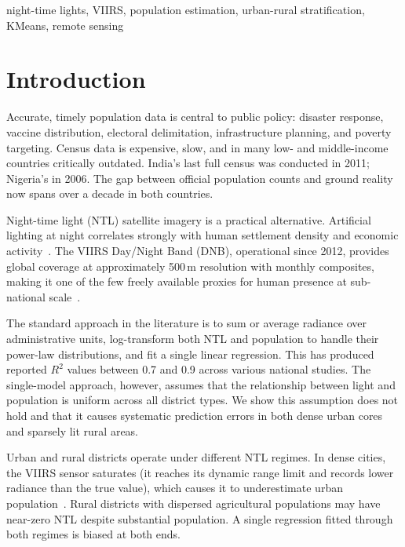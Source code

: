 \documentclass[conference]{IEEEtran}
\begin{document}
\begin{IEEEkeywords}
night-time lights, VIIRS, population estimation, urban-rural stratification, KMeans, remote sensing
\end{IEEEkeywords}

\section{Introduction}

Accurate, timely population data is central to public policy: disaster response, vaccine distribution, electoral delimitation, infrastructure planning, and poverty targeting. Census data is expensive, slow, and in many low- and middle-income countries critically outdated. India's last full census was conducted in 2011; Nigeria's in 2006. The gap between official population counts and ground reality now spans over a decade in both countries.

Night-time light (NTL) satellite imagery is a practical alternative. Artificial lighting at night correlates strongly with human settlement density and economic activity~\cite{sutton1997}. The VIIRS Day/Night Band (DNB), operational since 2012, provides global coverage at approximately 500\,m resolution with monthly composites, making it one of the few freely available proxies for human presence at sub-national scale~\cite{elvidge2021}.

The standard approach in the literature is to sum or average radiance over administrative units, log-transform both NTL and population to handle their power-law distributions, and fit a single linear regression. This has produced reported $R^2$ values between 0.7 and 0.9 across various national studies. The single-model approach, however, assumes that the relationship between light and population is uniform across all district types. We show this assumption does not hold and that it causes systematic prediction errors in both dense urban cores and sparsely lit rural areas.

Urban and rural districts operate under different NTL regimes. In dense cities, the VIIRS sensor saturates (it reaches its dynamic range limit and records lower radiance than the true value), which causes it to underestimate urban population~\cite{elvidge2017}. Rural districts with dispersed agricultural populations may have near-zero NTL despite substantial population. A single regression fitted through both regimes is biased at both ends.
\end{document}
